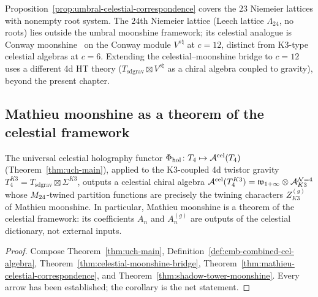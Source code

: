 \begin{remark}
\label{rem:cmb-umbral-reach}
Proposition~\ref{prop:umbral-celestial-correspondence} covers the $23$
Niemeier lattices with nonempty root system. The $24$th Niemeier
lattice (Leech lattice $\Lambda_{24}$, no roots) lies outside the
umbral moonshine framework; its celestial analogue is Conway
moonshine~\cite{DuncanMackOno} on the Conway module $V^{s\natural}$ at
$c = 12$, distinct from K3-type celestial algebras at $c = 6$.
Extending the celestial--moonshine bridge to $c = 12$ uses a
different 4d HT theory ($T_{\mathrm{sd grav}} \boxtimes V^{s\natural}$
as a chiral algebra coupled to gravity), beyond
the present chapter.
\end{remark}

\subsection{Mathieu moonshine as a theorem of the celestial framework}
\label{subsec:cmb-corollary}

\begin{corollary}
\label{cor:celestial-holography-recovers-moonshine}
The universal celestial holography functor
$\Phi_{\mathrm{hol}} \colon T_4 \mapsto \mathcal A^{\mathrm{cel}}(T_4)$
(Theorem~\ref{thm:uch-main}), applied to the K3-coupled 4d twistor
gravity $T_4^{K3} = T_{\mathrm{sd grav}} \boxtimes \Sigma^{K3}$,
outputs a celestial chiral algebra
$\mathcal A^{\mathrm{cel}}(T_4^{K3}) = \mathfrak w_{1+\infty} \otimes \mathcal A^{\mathcal{N}{=}4}_{K3}$ whose
$M_{24}$-twined partition functions are precisely the twining
characters $Z_{K3}^{(g)}$ of Mathieu moonshine. In particular,
Mathieu moonshine is a theorem of the celestial framework: its
coefficients $A_n$ and $A_n^{(g)}$ are outputs of the celestial
dictionary, not external inputs.
\end{corollary}

\begin{proof}
Compose Theorem~\ref{thm:uch-main}, Definition~\ref{def:cmb-combined-cel-algebra},
Theorem~\ref{thm:celestial-moonshine-bridge},
Theorem~\ref{thm:mathieu-celestial-correspondence}, and
Theorem~\ref{thm:shadow-tower-moonshine}. Every arrow has been
established; the corollary is the net statement.
\end{proof}

